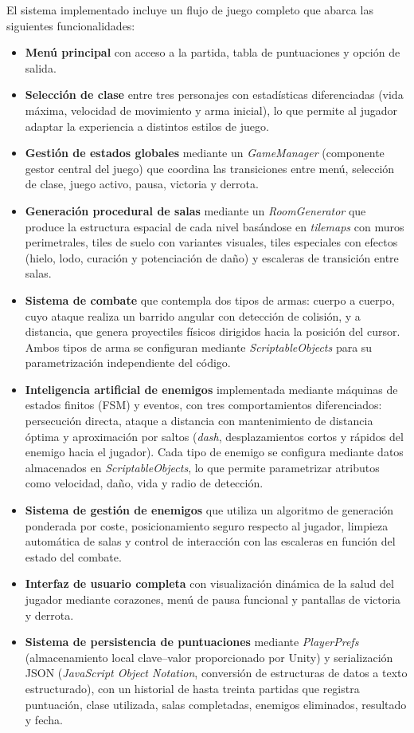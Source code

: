 El sistema implementado incluye un flujo de juego completo que abarca las siguientes funcionalidades:

\begin{itemize}
\item \textbf{Menú principal} con acceso a la partida, tabla de puntuaciones y opción de salida.
\item \textbf{Selección de clase} entre tres personajes con estadísticas diferenciadas (vida máxima, velocidad de movimiento y arma inicial), lo que permite al jugador adaptar la experiencia a distintos estilos de juego.
\item \textbf{Gestión de estados globales} mediante un \textit{GameManager} (componente gestor central del juego) que coordina las transiciones entre menú, selección de clase, juego activo, pausa, victoria y derrota.
\item \textbf{Generación procedural de salas} mediante un \textit{RoomGenerator} que produce la estructura espacial de cada nivel basándose en \textit{tilemaps} con muros perimetrales, tiles de suelo con variantes visuales, tiles especiales con efectos (hielo, lodo, curación y potenciación de daño) y escaleras de transición entre salas.
\item \textbf{Sistema de combate} que contempla dos tipos de armas: cuerpo a cuerpo, cuyo ataque realiza un barrido angular con detección de colisión, y a distancia, que genera proyectiles físicos dirigidos hacia la posición del cursor. Ambos tipos de arma se configuran mediante \textit{ScriptableObjects} para su parametrización independiente del código.
\item \textbf{Inteligencia artificial de enemigos} implementada mediante máquinas de estados finitos (FSM) y eventos, con tres comportamientos diferenciados: persecución directa, ataque a distancia con mantenimiento de distancia óptima y aproximación por saltos (\textit{dash}, desplazamientos cortos y rápidos del enemigo hacia el jugador). Cada tipo de enemigo se configura mediante datos almacenados en \textit{ScriptableObjects}, lo que permite parametrizar atributos como velocidad, daño, vida y radio de detección.
\item \textbf{Sistema de gestión de enemigos} que utiliza un algoritmo de generación ponderada por coste, posicionamiento seguro respecto al jugador, limpieza automática de salas y control de interacción con las escaleras en función del estado del combate.
\item \textbf{Interfaz de usuario completa} con visualización dinámica de la salud del jugador mediante corazones, menú de pausa funcional y pantallas de victoria y derrota.
\item \textbf{Sistema de persistencia de puntuaciones} mediante \textit{PlayerPrefs} (almacenamiento local clave–valor proporcionado por Unity) y serialización JSON (\textit{JavaScript Object Notation}, conversión de estructuras de datos a texto estructurado), con un historial de hasta treinta partidas que registra puntuación, clase utilizada, salas completadas, enemigos eliminados, resultado y fecha.
\end{itemize}

